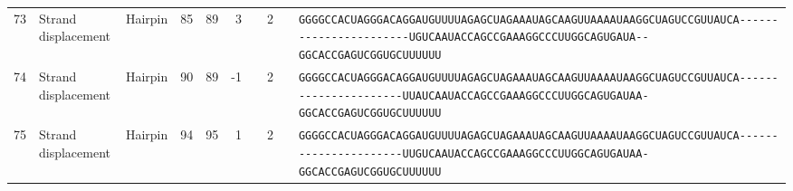 \begin{tabular}{rllrrrrrcl}
 73 & Strand displacement & Hairpin & 85 & 89 & 3 &   & 2 &  &                                                                                                                                                     
 \color{ucsfdarkgrey}\verb|GGGGCCACUAGGGACAGGAU|\color{ucsforange}\verb|GUUUUA|\color{ucsfblue}\verb|GAGCUAGAAAUAGCAAGU|\color{ucsforange}\verb|UAAAAUAA|\color{ucsfnavy}\verb|GGCUAGUCC|\color{ucsforange}\verb|GUUAUCA|\color{ucsfteal}\verb|-----------------------UGUCA|\color{ucsfpurple}\verb|AUACCAGCCGAAAGGCCCUUGGCAG|\color{ucsfteal}\verb|UGAUA--|\color{ucsforange}\verb|GGCACCGAGUCGGUGCUUUUUU| \\
                                                                                                                                                                                                                   
 74 & Strand displacement & Hairpin & 90 & 89 & -1 &   & 2 &  &                                                                                                                                                    
 \color{ucsfdarkgrey}\verb|GGGGCCACUAGGGACAGGAU|\color{ucsforange}\verb|GUUUUA|\color{ucsfblue}\verb|GAGCUAGAAAUAGCAAGU|\color{ucsforange}\verb|UAAAAUAA|\color{ucsfnavy}\verb|GGCUAGUCC|\color{ucsforange}\verb|GUUAUCA|\color{ucsfteal}\verb|----------------------UUAUCA|\color{ucsfpurple}\verb|AUACCAGCCGAAAGGCCCUUGGCAG|\color{ucsfteal}\verb|UGAUAA-|\color{ucsforange}\verb|GGCACCGAGUCGGUGCUUUUUU| \\
                                                                                                                                                                                                                   
 75 & Strand displacement & Hairpin & 94 & 95 & 1 &   & 2 &  &                                                                                                                                                     
 \color{ucsfdarkgrey}\verb|GGGGCCACUAGGGACAGGAU|\color{ucsforange}\verb|GUUUUA|\color{ucsfblue}\verb|GAGCUAGAAAUAGCAAGU|\color{ucsforange}\verb|UAAAAUAA|\color{ucsfnavy}\verb|GGCUAGUCC|\color{ucsforange}\verb|GUUAUCA|\color{ucsfteal}\verb|----------------------UUGUCA|\color{ucsfpurple}\verb|AUACCAGCCGAAAGGCCCUUGGCAG|\color{ucsfteal}\verb|UGAUAA-|\color{ucsforange}\verb|GGCACCGAGUCGGUGCUUUUUU| \\
                                                                                                                                                                                                                   

\end{tabular}
